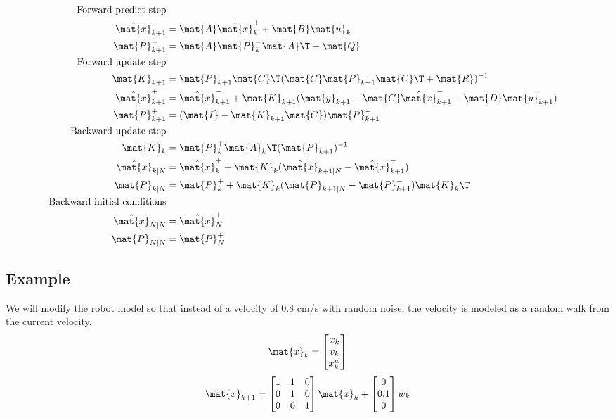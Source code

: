 \begin{theorem}
  \label{thm:kalman_smoother}
  \begin{align}
    \text{Forward predict step} \nonumber \\
    \hat{\mat{x}}_{k+1}^- &= \mat{A}\hat{\mat{x}}_k^+ + \mat{B} \mat{u}_k \\
    \mat{P}_{k+1}^- &= \mat{A} \mat{P}_k^- \mat{A}\T + \mat{Q} \\
    \text{Forward update step} \nonumber \\
    \mat{K}_{k+1} &=
      \mat{P}_{k+1}^- \mat{C}\T (\mat{C}\mat{P}_{k+1}^- \mat{C}\T +
      \mat{R})^{-1} \\
    \hat{\mat{x}}_{k+1}^+ &=
      \hat{\mat{x}}_{k+1}^- + \mat{K}_{k+1}(\mat{y}_{k+1} -
      \mat{C} \hat{\mat{x}}_{k+1}^- - \mat{D}\mat{u}_{k+1}) \\
    \mat{P}_{k+1}^+ &= (\mat{I} - \mat{K}_{k+1}\mat{C})\mat{P}_{k+1}^- \\
    \text{Backward update step} \nonumber \\
    \mat{K}_k &= \mat{P}_k^+ \mat{A}_k\T (\mat{P}_{k+1}^-)^{-1} \\
    \hat{\mat{x}}_{k|N} &= \hat{\mat{x}}_k^+ +
      \mat{K}_k(\hat{\mat{x}}_{k+1|N} - \hat{\mat{x}}_{k+1}^-) \\
    \mat{P}_{k|N} &=
      \mat{P}_k^+ + \mat{K}_k(\mat{P}_{k+1|N} - \mat{P}_{k+1}^-)\mat{K}_k\T \\
    \text{Backward initial conditions} \nonumber \\
    \hat{\mat{x}}_{N|N} &= \hat{\mat{x}}_N^+ \\
    \mat{P}_{N|N} &= \mat{P}_N^+
  \end{align}
\end{theorem}

\subsection{Example}

We will modify the robot model so that instead of a velocity of $0.8$ cm/s with
random noise, the velocity is modeled as a random walk from the current
velocity.
\begin{equation}
  \mat{x}_k =
  \begin{bmatrix}
    x_k \\
    v_k \\
    x_k^w
  \end{bmatrix}
\end{equation}
\begin{equation}
  \mat{x}_{k+1} =
  \begin{bmatrix}
    1 & 1 & 0 \\
    0 & 1 & 0 \\
    0 & 0 & 1
  \end{bmatrix} \mat{x}_k +
  \begin{bmatrix}
    0 \\
    0.1 \\
    0
  \end{bmatrix} w_k
\end{equation}


